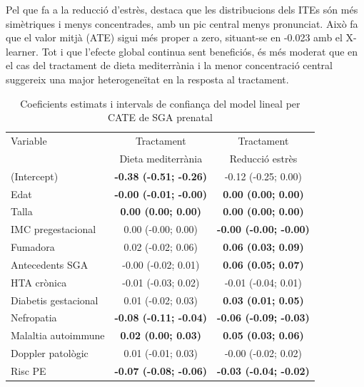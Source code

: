 \documentclass[../main.tex]{subfiles}
\begin{document}
    Pel que fa a la reducció d'estrès, destaca que les distribucions dels ITEs són més simètriques i menys concentrades, amb un pic central menys pronunciat. Això fa que el valor mitjà (ATE) sigui més proper a zero, situant-se en -0.023 amb el X-learner. Tot i que l’efecte global continua sent beneficiós, és més moderat que en el cas del tractament de dieta mediterrània i la menor concentració central suggereix una major heterogeneïtat en la resposta al tractament.



    \begin{table}[H]
        \centering
        \captionsetup{font=small}
        \caption{Coeficients estimats i intervals de confiança del model lineal per CATE de SGA prenatal}
        \label{tab:coef_SGAprenat}
        \centering
        \scriptsize
        \begin{tabular}[t]{p{4cm} c @{\hspace{1cm}} c}
        \toprule
        Variable & Tractament  & Tractament \\
         & Dieta mediterrània & Reducció estrès \\
        \midrule
        (Intercept) & \textbf{-0.38 (-0.51; -0.26)} & -0.12 (-0.25; 0.00)\\
        Edat & \textbf{-0.00 (-0.01; -0.00)} & \textbf{0.00 (0.00; 0.00)}\\
        Talla & \textbf{0.00 (0.00; 0.00)} & \textbf{0.00 (0.00; 0.00)}\\
        IMC pregestacional & 0.00 (-0.00; 0.00) & \textbf{-0.00 (-0.00; -0.00)}\\
        Fumadora & 0.02 (-0.02; 0.06) & \textbf{0.06 (0.03; 0.09)}\\
        \addlinespace
        Antecedents SGA & -0.00 (-0.02; 0.01) & \textbf{0.06 (0.05; 0.07)}\\
        HTA crònica & -0.01 (-0.03; 0.02) & -0.01 (-0.04; 0.01)\\
        Diabetis gestacional & 0.01 (-0.02; 0.03) & \textbf{0.03 (0.01; 0.05)}\\
        Nefropatia & \textbf{-0.08 (-0.11; -0.04)} & \textbf{-0.06 (-0.09; -0.03)}\\
        Malaltia autoimmune & \textbf{0.02 (0.00; 0.03)} & \textbf{0.05 (0.03; 0.06)}\\
        \addlinespace
        Doppler patològic & 0.01 (-0.01; 0.03) & -0.00 (-0.02; 0.02)\\
        Risc PE & \textbf{-0.07 (-0.08; -0.06)} & \textbf{-0.03 (-0.04; -0.02)}\\

\end{tabular}
\end{table}
\end{document}
